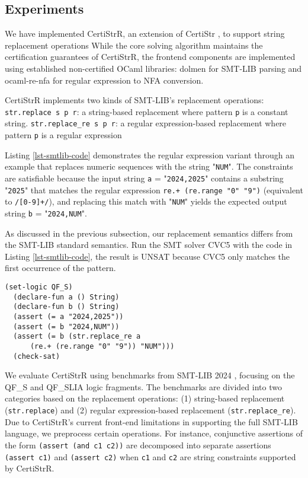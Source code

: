 \documentclass[sigplan,10pt,anonymous,review]{acmart}\settopmatter{printfolios=true,printccs=false,printacmref=false}
\begin{document}
\subsection{Experiments}

We have implemented CertiStrR, an extension of  CertiStr \cite{cpp/KanLRS22}, to support string replacement operations
While the core solving algorithm maintains the certification guarantees of CertiStrR, the frontend components are implemented using established non-certified  OCaml libraries: dolmen \cite{dolmen} for SMT-LIB parsing and ocaml-re-nfa \cite{ocaml-re-nfa} for regular expression to NFA conversion. 

CertiStrR implements two kinds of SMT-LIB's replacement operations:
\texttt{str.replace s p r}: a string-based replacement where pattern \texttt{p} is a constant string. \texttt{str.replace\_re s p r}: a regular expression-based replacement where pattern \texttt{p} is a regular expression

Listing \ref{lst-smtlib-code} demonstrates the regular expression variant through an example that replaces numeric sequences with the string "\texttt{NUM}". The constraints are satisfiable because the input string \texttt{a} = "\texttt{2024,2025}" contains a substring "\texttt{2025}" that matches the regular expression \texttt{re.+ (re.range "0" "9")} (equivalent to \texttt{/[0-9]+/}), and replacing this match with "\texttt{NUM}" yields the expected output string \texttt{b} = "\texttt{2024,NUM}".
%

As discussed in the previous subsection, our replacement semantics differs from the SMT-LIB standard semantics.
Run the SMT solver CVC5 \cite{cvc5} with the code in Listing \ref{lst-smtlib-code}, the result is UNSAT because CVC5 only matches the first occurrence of the pattern.


\begin{lstlisting}[language=SMTLIB, caption={Example SMT-LIB Code}, label={lst-smtlib-code}]
  (set-logic QF_S)
  (declare-fun a () String)
  (declare-fun b () String)
  (assert (= a "2024,2025"))
  (assert (= b "2024,NUM"))
  (assert (= b (str.replace_re a 
      (re.+ (re.range "0" "9")) "NUM")))
  (check-sat)
  \end{lstlisting}


  We evaluate CertiStrR using benchmarks from SMT-LIB 2024 \cite{smtlib_benchmarks}, focusing on the QF\_S and QF\_SLIA logic fragments. The benchmarks are divided into two categories based on the replacement operations: (1) string-based replacement (\texttt{str.replace}) and (2) regular expression-based replacement (\texttt{str.replace\_re}). Due to CertiStrR's current front-end limitations in supporting the full SMT-LIB language, we preprocess certain operations. For instance, conjunctive assertions of the form \texttt{(assert (and c1 c2))} are decomposed into separate assertions \texttt{(assert c1)} and \texttt{(assert c2)} when \texttt{c1} and \texttt{c2} are string constraints supported by CertiStrR.
\end{document}
